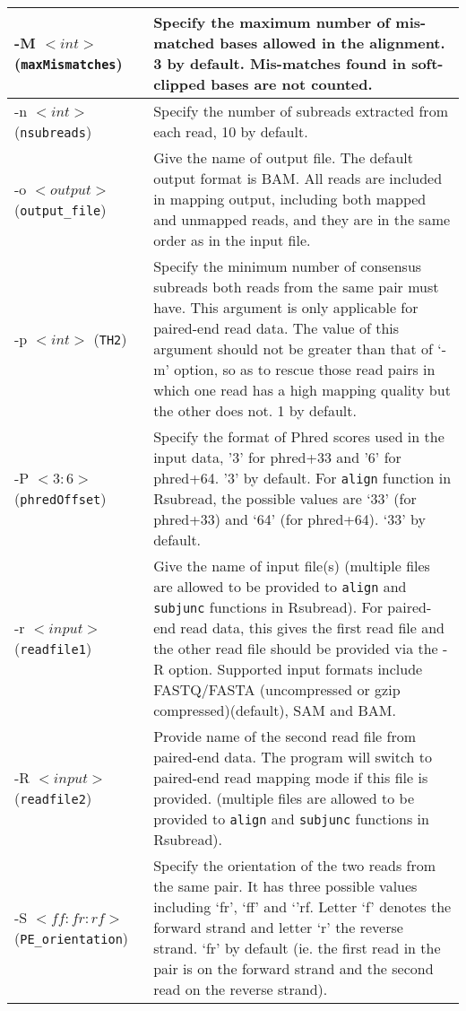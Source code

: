 \documentclass[12pt]{report}
\newcommand{\code}[1]{{\small\texttt{#1}}}
\newcommand{\Rsubread}{\textsf{Rsubread}}
\begin{document}
\begin{longtable}{|p{4cm}|p{12cm}|}
\hline
-M $<int>$ \newline (\code{maxMismatches}) & Specify the maximum number of mis-matched bases allowed in the alignment. 3 by default. Mis-matches found in soft-clipped bases are not counted.\\
\hline
-n $<int>$ \newline (\code{nsubreads}) & Specify the number of subreads extracted from each read, 10 by default.\\
\hline
-o $<output>$ \newline (\code{output\_file}) & Give the name of output file. The default output format is BAM. All reads are included in mapping output, including both mapped and unmapped reads, and they are in the same order as in the input file.\\
\hline
-p $<int>$ \newline (\code{TH2}) & Specify the minimum number of consensus subreads both reads from the same pair must have. This argument is only applicable for paired-end read data. The value of this argument should not be greater than that of `-m' option, so as to rescue those read pairs in which one read has a high mapping quality but the other does not. 1 by default.\\
\hline
-P $<3:6>$ \newline (\code{phredOffset}) & Specify the format of Phred scores used in the input data, '3' for phred+33 and '6' for phred+64. '3' by default. For \code{align} function in \Rsubread, the possible values are `33' (for phred+33) and `64' (for phred+64). `33' by default.\\
\hline
-r $<input>$ \newline (\code{readfile1}) & Give the name of input file(s) (multiple files are allowed to be provided to \code{align} and \code{subjunc} functions in {\Rsubread}). For paired-end read data, this gives the first read file and the other read file should be provided via the -R option. Supported input formats include FASTQ/FASTA (uncompressed or gzip compressed)(default), SAM and BAM.\\
\hline
-R $<input>$ \newline (\code{readfile2}) & Provide name of the second read file from paired-end data. The program will switch to paired-end read mapping mode if this file is provided. (multiple files are allowed to be provided to \code{align} and \code{subjunc} functions in {\Rsubread}).\\
\hline
-S $<ff:fr:rf>$ \newline (\code{PE\_orientation}) & Specify the orientation of the two reads from the same pair. It has three possible values including `fr', `ff' and `'rf. Letter `f' denotes the forward strand and letter `r' the reverse strand. `fr' by default (ie. the first read in the pair is on the forward strand and the second read on the reverse strand).\\

\end{longtable}
\end{document}

